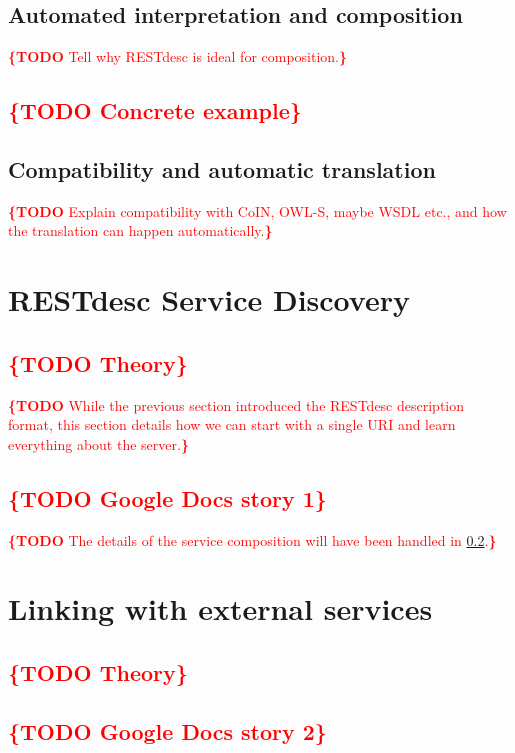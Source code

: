 \documentclass[runningheads,a4paper, twocolumn]{llncs}
\newcommand{\todo}[1]{\noindent\textcolor{red}{{\bf \{TODO} #1{\bf \}}}}
\begin{document}


\subsection{Automated interpretation and composition}
\todo{Tell why RESTdesc is ideal for composition.}

\subsection{\todo{Concrete example}}
\label{CompositionExample}

\subsection{Compatibility and automatic translation}
\todo{Explain compatibility with CoIN, OWL-S, maybe WSDL etc., and how the translation can happen automatically.}

\clearpage


\section{RESTdesc Service Discovery}
\subsection{\todo{Theory}}
\todo{While the previous section introduced the RESTdesc description format, this section details how we can start with a single URI and learn everything about the server.}

\subsection{\todo{Google Docs story 1}}
\todo{The details of the service composition will have been handled in \ref{CompositionExample}.}


\section{Linking with external services}
\subsection{\todo{Theory}}
\subsection{\todo{Google Docs story 2}}
\end{document}
